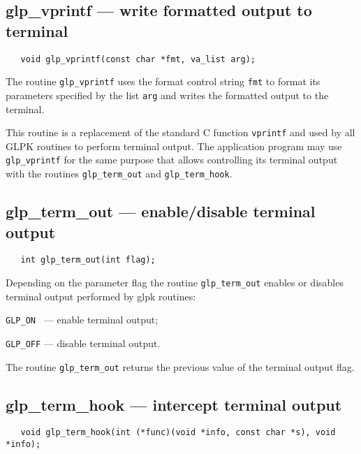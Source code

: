 \subsection{glp\_vprintf --- write formatted output to terminal}

\synopsis

\begin{verbatim}
   void glp_vprintf(const char *fmt, va_list arg);
\end{verbatim}

\description

The routine \verb|glp_vprintf| uses the format control string
\verb|fmt| to format its parameters specified by the list \verb|arg|
and writes the formatted output to the terminal.

This routine is a replacement of the standard C function
\verb|vprintf| and used by all GLPK routines to perform terminal
output. The application program may use \verb|glp_vprintf| for the same
purpose that allows controlling its terminal output with the routines
\verb|glp_term_out| and \verb|glp_term_hook|.

\newpage

\subsection{glp\_term\_out --- enable/disable terminal output}

\synopsis

\begin{verbatim}
   int glp_term_out(int flag);
\end{verbatim}

\description

Depending on the parameter flag the routine \verb|glp_term_out| enables
or disables terminal output performed by glpk routines:

\verb|GLP_ON | --- enable terminal output;

\verb|GLP_OFF| --- disable terminal output.

\returns

The routine \verb|glp_term_out| returns the previous value of the
terminal output flag.

\subsection{glp\_term\_hook --- intercept terminal output}

\synopsis

\begin{verbatim}
   void glp_term_hook(int (*func)(void *info, const char *s), void *info);
\end{verbatim}

